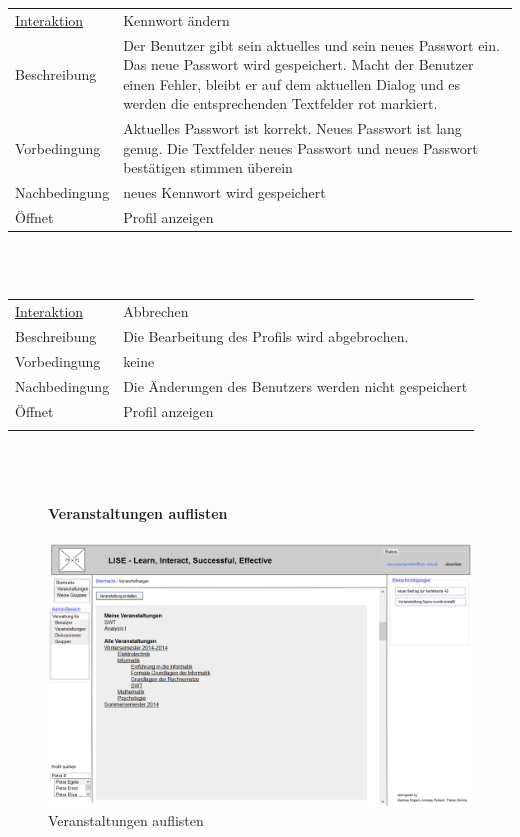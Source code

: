 \documentclass[12pt,a4paper]{article}
\begin{document}
{\begin{tabular}{l p{12cm}}
\underline{Interaktion}  	 & Kennwort ändern\\ 
Beschreibung   	 & Der Benutzer gibt sein aktuelles und sein neues Passwort ein. Das neue Passwort wird gespeichert. Macht der Benutzer einen Fehler, bleibt er auf dem aktuellen Dialog und es werden die entsprechenden Textfelder rot markiert. \\
Vorbedingung   	 & Aktuelles Passwort ist korrekt. Neues Passwort ist lang genug. Die Textfelder neues Passwort und neues Passwort bestätigen stimmen überein\\
Nachbedingung 	 & neues Kennwort wird gespeichert\\
Öffnet			 & \glqq Profil anzeigen\grqq\\
\end{tabular}\\\\

\begin{tabular}{l p{12cm}}
\underline{Interaktion} 	 & Abbrechen\\ 
Beschreibung   	 & Die Bearbeitung des Profils wird abgebrochen. \\
Vorbedingung   	 & keine\\
Nachbedingung 	 & Die Änderungen des Benutzers werden nicht gespeichert\\
Öffnet			 & \glqq Profil anzeigen\grqq\\\\
\end{tabular}\\\\  

\begin{figure}[H]
	\centering
	\paragraph{Veranstaltungen auflisten}
	\includegraphics[width=\textwidth]{Bilder/Mockups/GUI/VeranstaltungenAuflisten.png}
	\caption{Veranstaltungen auflisten}
	\label{VeranstaltungenAuflisten}
\end{figure}

}
\end{document}
